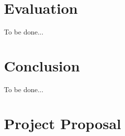 \documentclass[12pt,a4paper,twoside,openright]{report}
\newcommand{\TOBEDONE}{{\LARGE To be done...}}
\begin{document}

\chapter{Evaluation}

\TOBEDONE


\chapter{Conclusion}

\TOBEDONE



\appendix

\chapter{Project Proposal}
\end{document}
